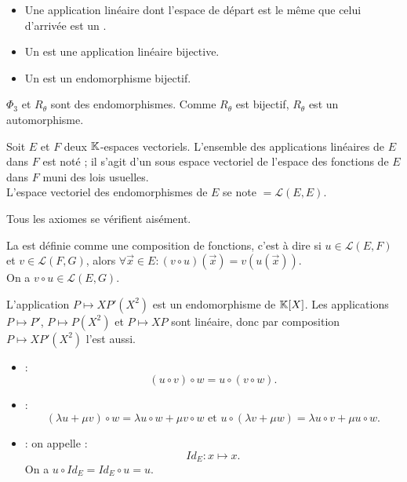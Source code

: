 \documentclass{book}
\begin{document}
\begin{Definition}[Endomorphisme]
\begin{itemize}
\item
  Une application linéaire dont l'espace de départ est le même que celui d'arrivée est un .
\item
  Un  est une application linéaire bijective.
\item
  Un  est un endomorphisme bijectif.
\end{itemize}
\end{Definition}
\begin{Exemple}
$\Phi _3$ et $R_\theta$ sont des endomorphismes. Comme $R_\theta$ est bijectif, $R_\theta$ est un automorphisme. 
\end{Exemple}
\begin{DefinitionProposition}
Soit $E$ et $F$ deux $\mathbb{K} $-espaces vectoriels.
L'ensemble des applications linéaires de $E$ dans $F$ est noté  ;
il s'agit d'un sous espace vectoriel de l'espace des fonctions de $E$ dans $F$ muni des lois usuelles.\\
L'espace vectoriel des endomorphismes de $E$ se note $= \mathcal{L}(E,E)$.
\end{DefinitionProposition}
\begin{Demonstration}
Tous les axiomes se vérifient aisément.  
\end{Demonstration}
\begin{Definition}
La  est définie comme une composition de fonctions, c'est à dire si $u\in\mathcal{L}(E,F)$ et $v\in\mathcal{L}(F,G) $,
 alors  $\forall \vec{x} \in E : (v\circ u)(\vec{x})=v(u(\vec{x}))$.\\
On a $v\circ u\in \mathcal{L}(E,G).$
 \end{Definition}
\begin{Exemple}
L'application $P\mapsto XP'(X^2)$ est un endomorphisme de $\mathbb{K}[X]$. Les applications $P\mapsto P'$, $P\mapsto P(X^2)$ et $P\mapsto XP$ sont linéaire, donc par composition  $P\mapsto XP'(X^2)$ l'est aussi.    
\end{Exemple} 
 \begin{Proposition}[Propriétés]
\begin{itemize}
\item
   : $$(u \circ v) \circ w =u \circ( v \circ w).$$
\item
   : 
  $$ (\lambda u + \mu v) \circ w = \lambda u\circ w + \mu v\circ w\text{ et }u\circ (\lambda v+ \mu w) =\lambda u\circ v + \mu u\circ w.$$
\item
   : on appelle  : $$Id_E:x\mapsto x.$$
 On a $ u\circ Id_E =Id_E\circ u = u.$ 
\end{itemize}
\end{Proposition}
\end{document}
